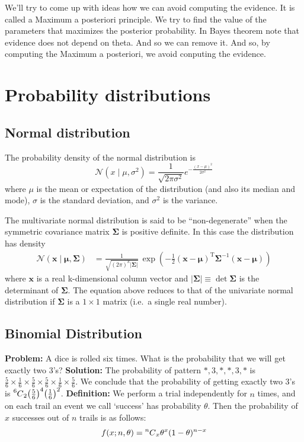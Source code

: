 \documentclass{book}
\newcommand\Mycomb[2][^n]{\prescript{#1\mkern-0.5mu}{}C_{#2}}
\begin{document}
We'll try to come up with ideas how we can avoid computing the evidence. It is called a Maximum a posteriori principle. We try to find the value of the parameters that maximizes the posterior probability. In Bayes theorem note that evidence does not depend on theta. And so we can remove it. And so, by computing the Maximum a posteriori, we avoid conputing the evidence.


\section{Probability distributions}
\subsection{Normal distribution}
The probability density of the normal distribution is
\[\displaystyle \mathcal{N}(x\mid \mu ,\sigma ^{2})={\frac {1}{\sqrt {2\pi \sigma ^{2}}}}e^{-{\frac {(x-\mu )^{2}}{2\sigma ^{2}}}}\]
where $\mu$ is the mean or expectation of the distribution (and also its median and mode), $\sigma$ is the standard deviation, and $\sigma^{2}$ is the variance.

The multivariate normal distribution is said to be ``non-degenerate'' when the symmetric covariance matrix $\boldsymbol {\Sigma }$ is positive definite. In this case the distribution has density
\begin{align*}
\mathcal{N}(\mathbf {x} \mid \boldsymbol {\mu }, \boldsymbol {\Sigma })&={\frac{1}{\sqrt {(2\pi )^{k}|{\boldsymbol {\Sigma }}|}} \, {\exp \left(-{\frac {1}{2}}({\mathbf {x} }-{\boldsymbol {\mu }})^{\mathrm {T} }{\boldsymbol {\Sigma }}^{-1}({\mathbf {x} }-{\boldsymbol {\mu }})\right)}}
\end{align*}
where $\mathbf {x}$ is a real k-dimensional column vector and $|{\boldsymbol {\Sigma }}|\equiv \operatorname {det} {\boldsymbol {\Sigma }}$ is the determinant of ${\boldsymbol {\Sigma }}$. 
The equation above reduces to that of the univariate normal distribution if ${\boldsymbol {\Sigma }}$ is a $1\times 1$ matrix (i.e.\ a single real number). 

\subsection{Binomial Distribution}
\textbf{Problem:} A dice is rolled six times. What is the probability that we will get exactly two 3's? \newline
\textbf{Solution:} The probability of pattern $*,3,*,*,3,*$ is $\frac{5}{6}\times\frac{1}{6}\times\frac{5}{6}\times\frac{5}{6}\times\frac{1}{6}\times\frac{5}{6}$. We conclude that the probability of getting exactly two 3's is $\Mycomb[6]{2}\big(\frac{5}{6}\big)^4\big(\frac{1}{6}\big)^2$. \newline
\textbf{Definition:} We perform a trial independently for $n$ times, and on each trail an event we call `success' has probability $\theta$. Then the probability of $x$ successes out of $n$ trails is as follows:
\[f(x;n,\theta) = \Mycomb[n]{x}{\theta}^x(1-{\theta})^{n-x}\]
\end{document}
